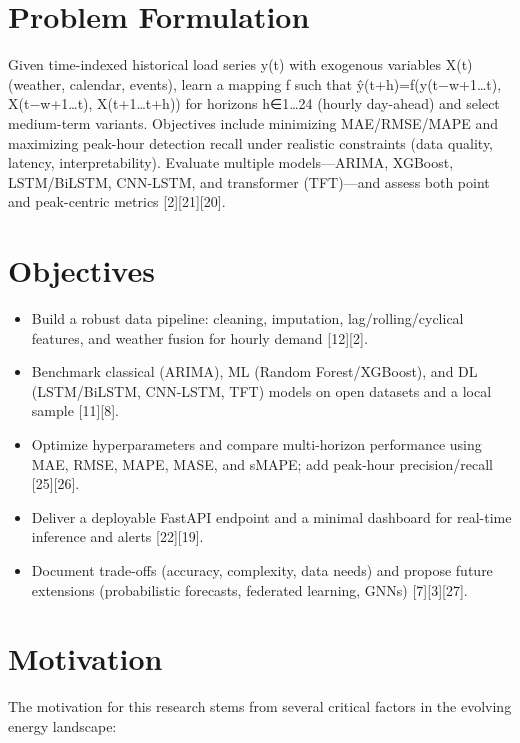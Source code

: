 \documentclass[12pt,a4paper]{report}
\begin{document}
\section{Problem Formulation}
Given time-indexed historical load series y(t) with exogenous variables X(t) (weather, calendar, events), learn a mapping f such that ŷ(t+h)=f(y(t−w+1…t), X(t−w+1…t), X(t+1…t+h)) for horizons h∈{1…24} (hourly day-ahead) and select medium-term variants. Objectives include minimizing MAE/RMSE/MAPE and maximizing peak-hour detection recall under realistic constraints (data quality, latency, interpretability). Evaluate multiple models—ARIMA, XGBoost, LSTM/BiLSTM, CNN-LSTM, and transformer (TFT)—and assess both point and peak-centric metrics [2][21][20].

\section{Objectives}
\begin{itemize}
\setlength{\itemsep}{0.2em}
\setlength{\parskip}{0pt}
\large
\item Build a robust data pipeline: cleaning, imputation, lag/rolling/cyclical features, and weather fusion for hourly demand [12][2].

\item Benchmark classical (ARIMA), ML (Random Forest/XGBoost), and DL (LSTM/BiLSTM, CNN-LSTM, TFT) models on open datasets and a local sample [11][8].

\item Optimize hyperparameters and compare multi-horizon performance using MAE, RMSE, MAPE, MASE, and sMAPE; add peak-hour precision/recall [25][26].

\item Deliver a deployable FastAPI endpoint and a minimal dashboard for real-time inference and alerts [22][19].

\item Document trade-offs (accuracy, complexity, data needs) and propose future extensions (probabilistic forecasts, federated learning, GNNs) [7][3][27].
\end{itemize}

\section{Motivation}
The motivation for this research stems from several critical factors in the evolving energy landscape:
\end{document}
